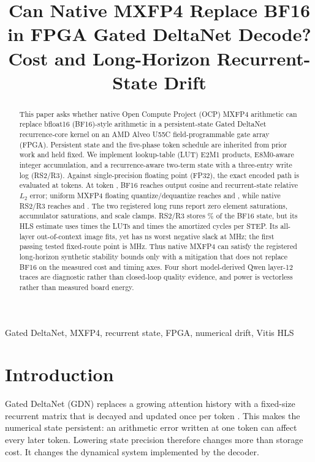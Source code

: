 \documentclass[conference]{IEEEtran}
\title{Can Native MXFP4 Replace BF16 in FPGA Gated DeltaNet Decode?\\
Cost and Long-Horizon Recurrent-State Drift}
\author{\IEEEauthorblockN{Anonymous Authors}}
\begin{document}
\maketitle

\begin{abstract}
This paper asks whether native Open Compute Project (OCP) MXFP4 arithmetic can
replace bfloat16 (BF16)-style arithmetic in a persistent-state Gated DeltaNet
recurrence-core kernel on an AMD Alveo U55C field-programmable gate array
(FPGA). Persistent state and the five-phase token schedule are inherited from
prior work and held fixed. We implement lookup-table (LUT) E2M1 products,
E8M0-aware integer accumulation, and a recurrence-aware two-term state with a
three-entry write log (RS2/R3). Against single-precision floating point (FP32),
the exact encoded path is evaluated at \RsTwoCheckpointSet{} tokens. At token
\RsTwoLongTokens, BF16 reaches \RsTwoBfSixteenCosineEightK{} output cosine and
\RsTwoBfSixteenStateLTwoEightK{} recurrent-state relative $L_2$ error; uniform
MXFP4 floating quantize/dequantize reaches \RsTwoQdqCosineEightK{} and
\RsTwoQdqStateLTwoEightK{}, while native RS2/R3 reaches
\RsTwoCandidateCosineEightK{} and \RsTwoCandidateStateLTwoEightK{}. The two
registered long runs report zero element saturations, accumulator saturations,
and scale clamps. RS2/R3 stores \RsTwoStatePercentOfBfSixteen{}\% of the BF16
state, but its HLS estimate uses \RsTwoHlsLutRatio{} times the LUTs and
\RsTwoHlsAmortizedRatio{} times the amortized cycles per STEP. Its all-layer
out-of-context image fits, yet has \RsTwoRouteTargetWns{} ns worst negative
slack at \RsTwoRouteTargetMhz{} MHz; the first passing tested fixed-route point
is \RsTwoRouteClosingMhz{} MHz. Thus native MXFP4 can satisfy the registered
long-horizon synthetic stability bounds only with a mitigation that does not replace BF16
on the measured cost and timing axes. Four short model-derived
Qwen layer-12 traces are diagnostic rather than closed-loop quality evidence,
and power is vectorless rather than measured board energy.
\end{abstract}

\begin{IEEEkeywords}
Gated DeltaNet, MXFP4, recurrent state, FPGA, numerical drift, Vitis HLS
\end{IEEEkeywords}

\section{Introduction}
Gated DeltaNet (GDN) replaces a growing attention history with a fixed-size
recurrent matrix that is decayed and updated once per token
\cite{gateddeltanet}. This makes the numerical state persistent: an arithmetic
error written at one token can affect every later token. Lowering state
precision therefore changes more than storage cost. It changes the dynamical
system implemented by the decoder.
\end{document}
